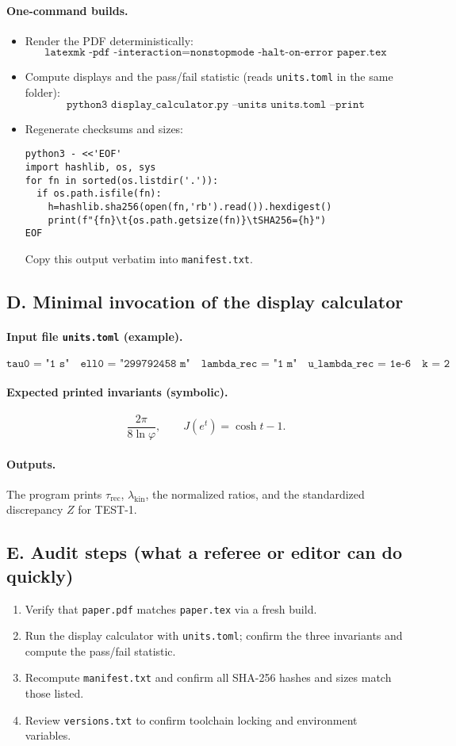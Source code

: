 \documentclass[11pt]{article}
\theoremstyle{plain}
\theoremstyle{definition}
\theoremstyle{remark}
\begin{document}
\paragraph{One-command builds.}
\begin{itemize}
  \item Render the PDF deterministically:
\[
\texttt{latexmk -pdf -interaction=nonstopmode -halt-on-error paper.tex}
\]
  \item Compute displays and the pass/fail statistic (reads \texttt{units.toml} in the same folder):
\[
\texttt{python3 display\_calculator.py --units units.toml --print}
\]
  \item Regenerate checksums and sizes:
\begin{verbatim}
python3 - <<'EOF'
import hashlib, os, sys
for fn in sorted(os.listdir('.')):
  if os.path.isfile(fn):
    h=hashlib.sha256(open(fn,'rb').read()).hexdigest()
    print(f"{fn}\t{os.path.getsize(fn)}\tSHA256={h}")
EOF
\end{verbatim}
Copy this output verbatim into \texttt{manifest.txt}.
\end{itemize}

\subsection*{D. Minimal invocation of the display calculator}
\paragraph{Input file \texttt{units.toml} (example).}
\[
\texttt{tau0 = "1 s"}\quad
\texttt{ell0 = "299792458 m"}\quad
\texttt{lambda\_rec = "1 m"}\quad
\texttt{u\_lambda\_rec = 1e-6}\quad
\texttt{k = 2}
\]
\paragraph{Expected printed invariants (symbolic).}
\[
\frac{2\pi}{8\ln\varphi},\qquad
J(e^{t})=\cosh t-1.
\]
\paragraph{Outputs.} The program prints \(\tau_{\mathrm{rec}}\), \(\lambda_{\mathrm{kin}}\), the normalized ratios, and the standardized discrepancy \(Z\) for TEST-1.

\subsection*{E. Audit steps (what a referee or editor can do quickly)}
\begin{enumerate}
  \item Verify that \texttt{paper.pdf} matches \texttt{paper.tex} via a fresh build.
  \item Run the display calculator with \texttt{units.toml}; confirm the three invariants and compute the pass/fail statistic.
  \item Recompute \texttt{manifest.txt} and confirm all SHA-256 hashes and sizes match those listed.
  \item Review \texttt{versions.txt} to confirm toolchain locking and environment variables.
\end{enumerate}
\end{document}
